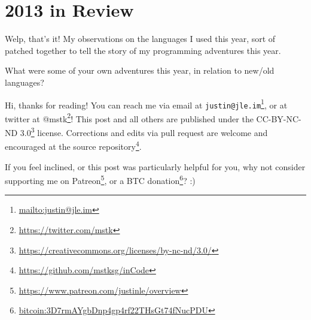 \documentclass[]{article}
\renewcommand{\href}[2]{#2\footnote{\url{#1}}}
\begin{document}
\hypertarget{in-review}{%
\section{2013 in Review}\label{in-review}}

Welp, that's it! My observations on the languages I used this year, sort of
patched together to tell the story of my programming adventures this year.

What were some of your own adventures this year, in relation to new/old
languages?

Hi, thanks for reading! You can reach me via email at
\href{mailto:justin@jle.im}{\nolinkurl{justin@jle.im}}, or at twitter at
\href{https://twitter.com/mstk}{@mstk}! This post and all others are published
under the \href{https://creativecommons.org/licenses/by-nc-nd/3.0/}{CC-BY-NC-ND
3.0} license. Corrections and edits via pull request are welcome and encouraged
at \href{https://github.com/mstksg/inCode}{the source repository}.

If you feel inclined, or this post was particularly helpful for you, why not
consider \href{https://www.patreon.com/justinle/overview}{supporting me on
Patreon}, or a \href{bitcoin:3D7rmAYgbDnp4gp4rf22THsGt74fNucPDU}{BTC donation}?
:)
\end{document}
